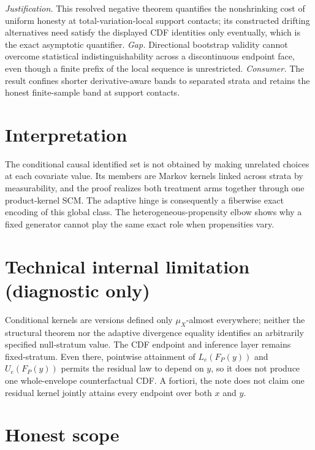\documentclass{article}
\begin{document}
\par\smallskip\noindent \textit{Justification.} This resolved negative theorem quantifies the nonshrinking cost of uniform honesty at total-variation-local support contacts; its constructed drifting alternatives need satisfy the displayed CDF identities only eventually, which is the exact asymptotic quantifier. \textit{Gap.} Directional bootstrap validity cannot overcome statistical indistinguishability across a discontinuous endpoint face, even though a finite prefix of the local sequence is unrestricted. \textit{Consumer.} The result confines shorter derivative-aware bands to separated strata and retains the honest finite-sample band at support contacts.

\section{Interpretation}

The conditional causal identified set is not obtained by making unrelated choices at each covariate value. Its members are Markov kernels linked across strata by measurability, and the proof realizes both treatment arms together through one product-kernel SCM. The adaptive hinge is consequently a fiberwise exact encoding of this global class. The heterogeneous-propensity elbow shows why a fixed generator cannot play the same exact role when propensities vary.

\section*{Technical internal limitation (diagnostic only)}

Conditional kernels are versions defined only \(\mu_X\)-almost everywhere; neither the structural theorem nor the adaptive divergence equality identifies an arbitrarily specified null-stratum value. The CDF endpoint and inference layer remains fixed-stratum. Even there, pointwise attainment of \(L_e(F_P(y))\) and \(U_e(F_P(y))\) permits the residual law to depend on \(y\), so it does not produce one whole-envelope counterfactual CDF. A fortiori, the note does not claim one residual kernel jointly attains every endpoint over both \(x\) and \(y\).

\section{Honest scope}
\end{document}
